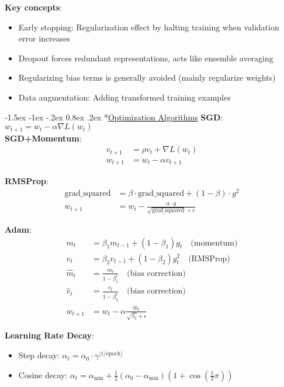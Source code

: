 \documentclass{article}
\makeatletter
\renewcommand\section{\@startsection{section}{1}{\z@}%
                                  {-1.5ex \@plus -1ex \@minus -.2ex}%
                                  {0.8ex \@plus.2ex}%
                                  {\normalfont\small\bfseries}}
\makeatother
\begin{document}
\begin{multicols}{3}
\textbf{Key concepts}:
\begin{itemize}
\item Early stopping: Regularization effect by halting training when validation error increases
\item Dropout forces redundant representations, acts like ensemble averaging
\item Regularizing bias terms is generally avoided (mainly regularize weights)
\item Data augmentation: Adding transformed training examples
\end{itemize}

\section*{\underline{Optimization Algorithms}}
\textbf{SGD}: $w_{t+1} = w_t - \alpha \nabla L(w_t)$\\
\textbf{SGD+Momentum}: 
\begin{align*}
v_{t+1} &= \rho v_t + \nabla L(w_t)\\
w_{t+1} &= w_t - \alpha v_{t+1}
\end{align*}

\textbf{RMSProp}:
\begin{align*}
\text{grad\_squared} &= \beta \cdot \text{grad\_squared} + (1-\beta) \cdot g^2\\
w_{t+1} &= w_t - \frac{\alpha \cdot g}{\sqrt{\text{grad\_squared}} + \epsilon}
\end{align*}

\textbf{Adam}:
\begin{align*}
m_t &= \beta_1 m_{t-1} + (1-\beta_1)g_t \quad \text{(momentum)}\\
v_t &= \beta_2 v_{t-1} + (1-\beta_2)g_t^2 \quad \text{(RMSProp)}\\
\hat{m}_t &= \frac{m_t}{1-\beta_1^t} \quad \text{(bias correction)}\\
\hat{v}_t &= \frac{v_t}{1-\beta_2^t} \quad \text{(bias correction)}\\
w_{t+1} &= w_t - \alpha \frac{\hat{m}_t}{\sqrt{\hat{v}_t} + \epsilon}
\end{align*}

\textbf{Learning Rate Decay}:
\begin{itemize}
\item Step decay: $\alpha_t = \alpha_0 \cdot \gamma^{\lfloor t/\text{epoch} \rfloor}$
\item Cosine decay: $\alpha_t = \alpha_{\text{min}} + \frac{1}{2}(\alpha_0 - \alpha_{\text{min}})(1 + \cos(\frac{t}{T}\pi))$
\end{itemize}


\end{multicols}
\end{document}
